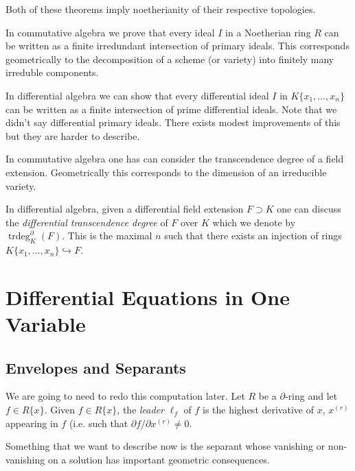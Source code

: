 \documentclass[12pt]{book}
\numberwithin{equation}{section}
\theoremstyle{definition}
\theoremstyle{remark}
\newcommand{\trdeg}{\operatorname{trdeg}}
\begin{document}
\begin{description}[leftmargin=*]
Both of these theorems imply noetherianity of their respective topologies.

\item[Primary Decompositions] In commutative algebra we prove that every ideal $I$ in a Noetherian ring $R$ can be written as a finite irredundant intersection of primary ideals. 
This corresponds geometrically to the decomposition of a scheme (or variety) into finitely many  irreduble components.

In differential algebra we can show that every differential ideal $I$ in $K\lbrace x_1,\ldots,x_n\rbrace$ can be written as a finite intersection of prime differential ideals.
Note that we didn't say differential primary ideals.
There exists modest improvements of this but they are harder to describe.

\item[Transcendence Degrees] 

In commutative algebra one has can consider the transcendence degree of a field extension. 
Geometrically this corresponds to the dimension of an irreducible variety.

In differential algebra, given a differential field extension $F\supset K$ one can discuss the \emph{differential transcendence degree} of $F$ over $K$ which we denote by $\trdeg_K^{\partial}(F)$.
This is the maximal $n$ such that there exists an injection of rings $K\lbrace x_1,\ldots,x_n\rbrace\hookrightarrow F$.
\end{description}



\section{Differential Equations in One Variable}



\subsection{Envelopes and Separants}
We are going to need to redo this computation later.
Let $R$ be a $\partial$-ring and let $f \in R\lbrace x \rbrace$. 
Given $f \in R\lbrace x \rbrace$, the \emph{leader} $\ell_f$ of $f$ is the highest derivative of $x$, $x^{(r)}$ appearing in $f$ (i.e. such that $\partial f/\partial x^{(r)} \neq 0$. 

Something that we want to describe now is the separant whose vanishing or non-vanishing on a solution has important geometric consequences.
\end{document}
